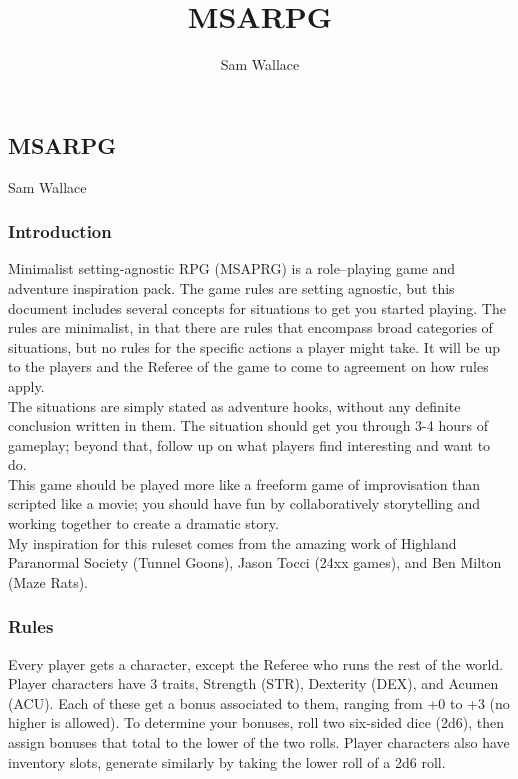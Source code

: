\documentclass[a4,landscape]{book}
\title{MSARPG}
\author{Sam Wallace}
\begin{document}
\begin{multicols*}{4}
\chapter*{MSARPG}

Sam Wallace

\subsection*{Introduction}
Minimalist setting-agnostic RPG (MSAPRG) is a role--playing game and adventure inspiration pack.
The game rules are setting agnostic, but this document includes several concepts for situations to get you started playing.
The rules are minimalist, in that there are rules that encompass broad categories of situations, but no rules for the specific actions a player might take.
It will be up to the players and the Referee of the game to come to agreement on how rules apply. \\

The situations are simply stated as adventure hooks, without any definite conclusion written in them.
The situation should get you through 3-4 hours of gameplay; beyond that, follow up on what players find interesting and want to do. \\

This game should be played more like a freeform game of improvisation than scripted like a movie; you should have fun by collaboratively storytelling and working together to create a dramatic story. \\

My inspiration for this ruleset comes from the amazing work of Highland Paranormal Society (Tunnel Goons), Jason Tocci (24xx games), and Ben Milton (Maze Rats).

\subsection*{Rules}
Every player gets a character, except the Referee who runs the rest of the world.
Player characters have 3 traits, Strength (STR), Dexterity (DEX), and Acumen (ACU).
Each of these get a bonus associated to them, ranging from +0 to +3 (no higher is allowed).
To determine your bonuses, roll two six-sided dice (2d6), then assign bonuses that total to the lower of the two rolls. 
Player characters also have inventory slots, generate similarly by taking the lower roll of a 2d6 roll. \\


\end{multicols*}
\end{document}
